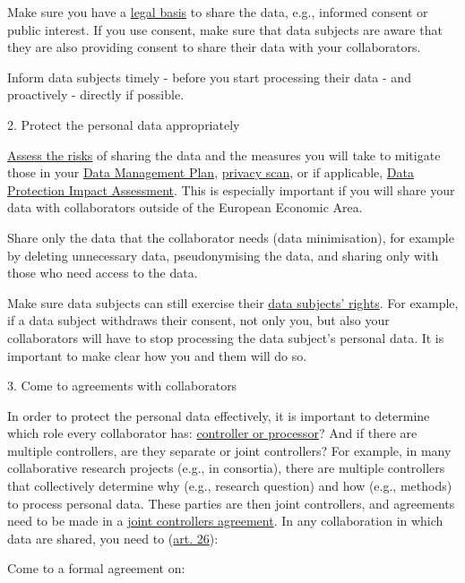\documentclass[
]{book}
\begin{document}
Make sure you have a \protect\hyperlink{legal-basis}{legal basis} to
share the data, e.g., informed consent or public interest. If you use
consent, make sure that data subjects are aware that they are also
providing consent to share their data with your collaborators.

Inform data subjects timely - before you start processing
their data - and proactively - directly if possible.

2. Protect the personal data appropriately

\protect\hyperlink{risk-assessment}{Assess the risks} of sharing the
data and the measures you will take to mitigate those in your
\href{https://www.uu.nl/en/research/research-data-management/guides/data-management-planning}{Data Management Plan},
\protect\hyperlink{privacy-scan}{privacy scan}, or if applicable,
\protect\hyperlink{dpia}{Data Protection Impact Assessment}.
This is especially important if you will share your data with
collaborators outside of the European Economic Area.

Share only the data that the collaborator needs (data minimisation),
for example by deleting unnecessary data, pseudonymising the data, and
sharing only with those who need access to the data.

Make sure data subjects can still exercise their
\protect\hyperlink{data-subject-rights}{data subjects' rights}. For example,
if a data subject withdraws their consent, not only you, but also your
collaborators will have to stop processing the data subject's personal
data. It is important to make clear how you and them will do so.

3. Come to agreements with collaborators

In order to protect the personal data effectively, it is important to
determine which role every collaborator has:
\protect\hyperlink{definitions}{controller or processor}? And if there are
multiple controllers, are they separate or joint controllers? For example,
in many collaborative research projects (e.g., in consortia), there are
multiple controllers that collectively determine why (e.g., research
question) and how (e.g., methods) to process personal data. These parties
are then joint controllers, and agreements need to be made in a
\protect\hyperlink{joint-controller-agreement}{joint controllers agreement}.
In any collaboration in which data are shared, you need to
(\href{https://gdpr-info.eu/art-26-gdpr/}{art. 26}):

Come to a formal agreement on:
\end{document}

